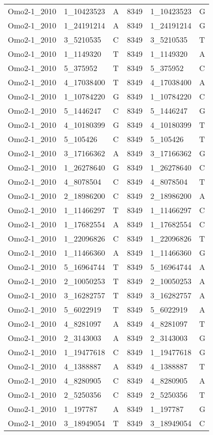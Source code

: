 \begin{center}
\begin{longtable}{|l|l|l|l|l|l|}
Omo2-1\_2010&1\_10423523&A&8349&1\_10423523&G\\
Omo2-1\_2010&1\_24191214&A&8349&1\_24191214&G\\
Omo2-1\_2010&3\_5210535&C&8349&3\_5210535&T\\
Omo2-1\_2010&1\_1149320&T&8349&1\_1149320&A\\
Omo2-1\_2010&5\_375952&T&8349&5\_375952&C\\
Omo2-1\_2010&4\_17038400&T&8349&4\_17038400&A\\
Omo2-1\_2010&1\_10784220&G&8349&1\_10784220&C\\
Omo2-1\_2010&5\_1446247&C&8349&5\_1446247&G\\
Omo2-1\_2010&4\_10180399&G&8349&4\_10180399&T\\
Omo2-1\_2010&5\_105426&C&8349&5\_105426&T\\
Omo2-1\_2010&3\_17166362&A&8349&3\_17166362&G\\
Omo2-1\_2010&1\_26278640&G&8349&1\_26278640&C\\
Omo2-1\_2010&4\_8078504&C&8349&4\_8078504&T\\
Omo2-1\_2010&2\_18986200&C&8349&2\_18986200&A\\
Omo2-1\_2010&1\_11466297&T&8349&1\_11466297&C\\
Omo2-1\_2010&1\_17682554&A&8349&1\_17682554&C\\
Omo2-1\_2010&1\_22096826&C&8349&1\_22096826&T\\
Omo2-1\_2010&1\_11466360&A&8349&1\_11466360&G\\
Omo2-1\_2010&5\_16964744&T&8349&5\_16964744&A\\
Omo2-1\_2010&2\_10050253&T&8349&2\_10050253&A\\
Omo2-1\_2010&3\_16282757&T&8349&3\_16282757&A\\
Omo2-1\_2010&5\_6022919&T&8349&5\_6022919&A\\
Omo2-1\_2010&4\_8281097&A&8349&4\_8281097&T\\
Omo2-1\_2010&2\_3143003&A&8349&2\_3143003&G\\
Omo2-1\_2010&1\_19477618&C&8349&1\_19477618&G\\
Omo2-1\_2010&4\_1388887&A&8349&4\_1388887&T\\
Omo2-1\_2010&4\_8280905&C&8349&4\_8280905&A\\
Omo2-1\_2010&2\_5250356&C&8349&2\_5250356&T\\
Omo2-1\_2010&1\_197787&A&8349&1\_197787&G\\
Omo2-1\_2010&3\_18949054&T&8349&3\_18949054&C\\

\end{longtable}
\end{center}
